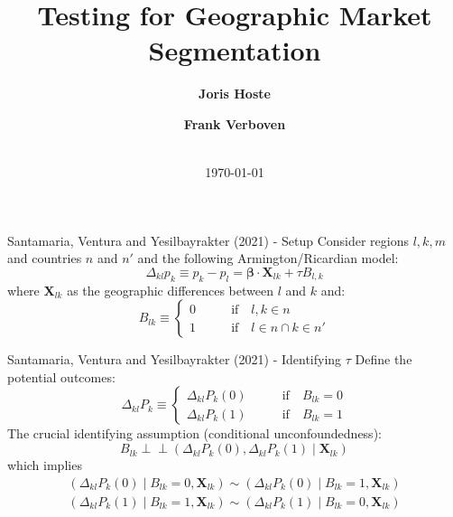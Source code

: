 \documentclass[aspectratio=169,10pt,hyperref={colorlinks,linkcolor={red!50!black},citecolor={blue!90!black},urlcolor={blue!80!black}},usenames,dvipsnames]{beamer}
\title{\textbf{Testing for Geographic Market Segmentation}}
\author[hoste]{\textbf{Joris Hoste} \inst{1} \and 
			   \textbf{Frank Verboven} \inst{2}}
\institute[inst]{\inst{1} KU Leuven \and %
                 \inst{2} KU Leuven \& CEPR}
\date{\vspace{10pt} \\ \today}
\newcommand{\indep}{\perp \!\!\! \perp}
\begin{document}

\begin{frame}
  \titlepage
\end{frame}

\begin{frame}{Santamaria, Ventura and Yesilbayrakter (2021) - Setup}
  Consider regions $l,k, m$ and countries $n$ and $n'$ and the following Armington/Ricardian model:  
  \begin{equation*}
    \Delta_{kl}p_{k} \equiv p_{k} - p_{l} = \boldsymbol{\beta}\cdot \boldsymbol{X}_{lk} + \tau B_{l,k}
  \end{equation*}
  where $\boldsymbol{X}_{lk}$ as the geographic differences between $l$ and $k$ and: 
  \begin{equation*} 
    B_{lk} \equiv
    \begin{cases}
      0 &\qquad \text{if} \quad l,k \in n \\
      1 &\qquad \text{if} \quad l \in n \cap k \in n'
    \end{cases}
  \end{equation*}
\end{frame}

\begin{frame}{Santamaria, Ventura and Yesilbayrakter (2021) - Identifying $\tau$}
  Define the potential outcomes:
  \begin{equation*}
    \Delta_{kl}P_{k} \equiv
    \begin{cases}
      \Delta_{kl}P_{k}(0) &\qquad \text{if} \quad B_{lk} = 0 \\
      \Delta_{kl}P_{k}(1) &\qquad \text{if} \quad B_{lk} = 1
    \end{cases}
  \end{equation*}
  The crucial identifying assumption (conditional unconfoundedness): 
  $$B_{lk} \indep \left(\Delta_{kl}P_{k}(0),\Delta_{kl}P_{k}(1) \middle\vert \boldsymbol{X}_{lk}\right)$$
  which implies 
  \begin{equation*}
    \begin{aligned}
      \left(\Delta_{kl}P_{k}(0) \middle \vert B_{lk} = 0,\boldsymbol{X}_{lk}\right) \sim  \left(\Delta_{kl}P_{k}(0) \middle \vert B_{lk} = 1,\boldsymbol{X}_{lk}\right) \\
      \left(\Delta_{kl}P_{k}(1) \middle \vert B_{lk} = 1,\boldsymbol{X}_{lk}\right) \sim  \left(\Delta_{kl}P_{k}(1) \middle \vert B_{lk} = 0,\boldsymbol{X}_{lk}\right) \\
    \end{aligned}
  \end{equation*}
\end{frame}
\end{document}
